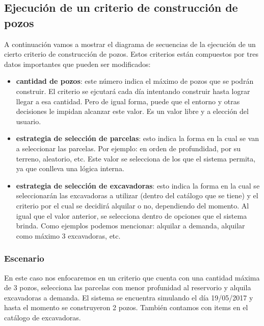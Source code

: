 \subsection{Ejecución de un criterio de construcción de pozos}

\par A continuación vamos a mostrar el diagrama de secuencias de la ejecución de un cierto criterio de construcción de pozos. Estos criterios están compuestos por tres datos importantes que pueden ser modificados:

\begin{itemize}
  \item \textbf{cantidad de pozos}: este número indica el máximo de pozos que se podrán construir. El criterio se ejcutará cada día intentando construir hasta lograr llegar a esa cantidad. Pero de igual forma, puede que el entorno y otras decisiones le impidan alcanzar este valor. Es un valor libre y a elección del usuario.
  \item \textbf{estrategia de selección de parcelas}: esto indica la forma en la cual se van a seleccionar las parcelas. Por ejemplo: en orden de profundidad, por su terreno, aleatorio, etc. Este valor se selecciona de los que el sistema permita, ya que conlleva una lógica interna.
  \item \textbf{estrategia de selección de excavadoras}: esto indica la forma en la cual se seleccionarán las excavadoras a utilizar (dentro del catálogo que se tiene) y el criterio por el cual se decidirá alquilar o no, dependiendo del momento. Al igual que el valor anterior, se selecciona dentro de opciones que el sistema brinda. Como ejemplos podemos mencionar: alquilar a demanda, alquilar como máximo 3 excavadoras, etc.
\end{itemize}

\subsubsection{Escenario}
\par En este caso nos enfocaremos en un criterio que cuenta con una cantidad máxima de 3 pozos, selecciona las parcelas con menor profunidad al reservorio y alquila excavadoras a demanda. El sistema se encuentra simulando el día 19/05/2017 y hasta el momento se construyeron 2 pozos. También contamos con items en el catálogo de excavadoras.

